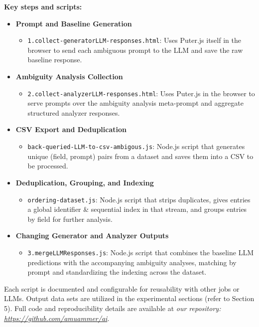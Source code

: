 \documentclass[conference]{IEEEtran}
\begin{document}
\textbf{Key steps and scripts:}
\begin{itemize}
    \item \textbf{Prompt and Baseline Generation}
        \begin{itemize}
            \item \texttt{1.collect-generatorLLM-responses.html}: Uses Puter.js itself in the browser to send each ambiguous prompt to the LLM and save the raw baseline response.
        \end{itemize}
    \item \textbf{Ambiguity Analysis Collection}
        \begin{itemize}
            \item \texttt{2.collect-analyzerLLM-responses.html}: Uses Puter.js in the browser to serve prompts over the ambiguity analysis meta-prompt and aggregate structured analyzer responses.
        \end{itemize}
    \item \textbf{CSV Export and Deduplication}
        \begin{itemize}
            \item \texttt{back-queried-LLM-to-csv-ambigous.js}: Node.js script that generates unique (field, prompt) pairs from a dataset and saves them into a CSV to be processed.
        \end{itemize}
    \item \textbf{Deduplication, Grouping, and Indexing}
        \begin{itemize}
            \item \texttt{ordering-dataset.js}: Node.js script that strips duplicates, gives entries a global identifier \& sequential index in that stream, and groups entries by field for further analysis.
        \end{itemize}
    \item \textbf{Changing Generator and Analyzer Outputs}
        \begin{itemize}
            \item \texttt{3.mergeLLMResponses.js}: Node.js script that combines the baseline LLM predictions with the accompanying ambiguity analyses, matching by prompt and standardizing the indexing across the dataset.
        \end{itemize}
\end{itemize}
Each script is documented and configurable for reusability with other jobs or LLMs. Output data sets are utilized in the experimental sections (refer to Section 5). Full code and reproducibility details are available at \textit{our repository\parencite{amuammer2025promptframework}: \url{https://github.com/amuammer/ai}.}
\end{document}
